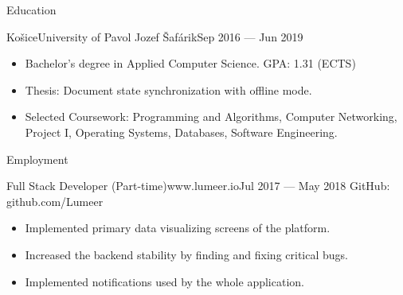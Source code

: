 \documentclass[]{style}
\begin{document}
	\makeheader
	
	\begin{cvsection}{Education}
		\begin{cvsubsection}{Košice}{University of Pavol Jozef Šafárik}{Sep 2016 — Jun 2019}
			\begin{itemize}
				\item Bachelor's degree in Applied Computer Science. GPA: 1.31 (ECTS)
				\item Thesis: Document state synchronization with offline mode.
				\item Selected Coursework: Programming and Algorithms, Computer Networking, Project I, Operating Systems, Databases, Software Engineering.
			\end{itemize}
		\end{cvsubsection}
	\end{cvsection}

	\begin{cvsection}{Employment}
		\begin{cvsubsection}{Full Stack Developer (Part-time)}{www.lumeer.io}{Jul 2017 — May 2018}
			GitHub: github.com/Lumeer
			\begin{itemize}
				\item Implemented primary data visualizing screens of the platform.
				\item Increased the backend stability by finding and fixing critical bugs.
				\item Implemented notifications used by the whole application.							
			\end{itemize}
		\end{cvsubsection}
	\end{cvsection}
	
\end{document}
